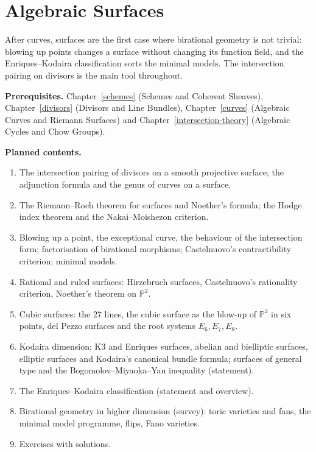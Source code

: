 \chapter{Algebraic Surfaces}\label{algebraic-surfaces}

After curves, surfaces are the first case where birational geometry is not trivial: blowing up points
changes a surface without changing its function field, and the Enriques--Kodaira classification sorts
the minimal models. The intersection pairing on divisors is the main tool throughout.

\noindent\textbf{Prerequisites.} Chapter~\ref{schemes} (Schemes and Coherent Sheaves), Chapter~\ref{divisors} (Divisors and Line Bundles), Chapter~\ref{curves} (Algebraic Curves and Riemann Surfaces) and Chapter~\ref{intersection-theory} (Algebraic Cycles and Chow Groups).

\noindent\textbf{Planned contents.}
\begin{enumerate}
\item The intersection pairing of divisors on a smooth projective surface; the adjunction formula and
the genus of curves on a surface.
\item The Riemann--Roch theorem for surfaces and Noether's formula; the Hodge index theorem and the
Nakai--Moishezon criterion.
\item Blowing up a point, the exceptional curve, the behaviour of the intersection form; factorisation
of birational morphisms; Castelnuovo's contractibility criterion; minimal models.
\item Rational and ruled surfaces: Hirzebruch surfaces, Castelnuovo's rationality criterion, Noether's
theorem on $\mathbb{P}^2$.
\item Cubic surfaces: the $27$ lines, the cubic surface as the blow-up of $\mathbb{P}^2$ in six points,
del Pezzo surfaces and the root systems $E_6, E_7, E_8$.
\item Kodaira dimension; K3 and Enriques surfaces, abelian and bielliptic surfaces, elliptic surfaces
and Kodaira's canonical bundle formula; surfaces of general type and the Bogomolov--Miyaoka--Yau inequality (statement).
\item The Enriques--Kodaira classification (statement and overview).
\item Birational geometry in higher dimension (survey): toric varieties and fans, the minimal model programme, flips, Fano varieties.
\item Exercises with solutions.
\end{enumerate}
